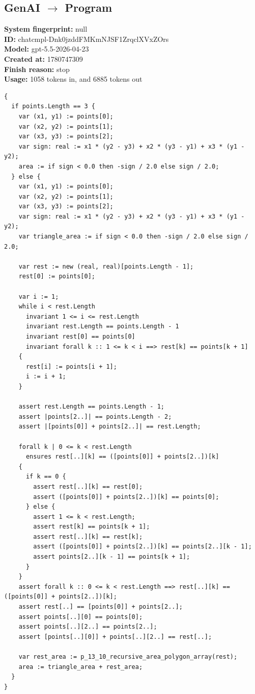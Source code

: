 \documentclass{article}
\begin{document}
\subsection*{GenAI $\rightarrow$ Program}
\textbf{System fingerprint: }null
\\\textbf{ID: }chatcmpl-Dnk0jzddFMKmNJSF1ZrqclXVxZOrs
\\\textbf{Model: }gpt-5.5-2026-04-23
\\\textbf{Created at: }1780747309
\\\textbf{Finish reason: }stop
\\\textbf{Usage: }1058 tokens in, and 6885 tokens out
\begin{lstlisting}
{
  if points.Length == 3 {
    var (x1, y1) := points[0];
    var (x2, y2) := points[1];
    var (x3, y3) := points[2];
    var sign: real := x1 * (y2 - y3) + x2 * (y3 - y1) + x3 * (y1 - y2);
    area := if sign < 0.0 then -sign / 2.0 else sign / 2.0;
  } else {
    var (x1, y1) := points[0];
    var (x2, y2) := points[1];
    var (x3, y3) := points[2];
    var sign: real := x1 * (y2 - y3) + x2 * (y3 - y1) + x3 * (y1 - y2);
    var triangle_area := if sign < 0.0 then -sign / 2.0 else sign / 2.0;

    var rest := new (real, real)[points.Length - 1];
    rest[0] := points[0];

    var i := 1;
    while i < rest.Length
      invariant 1 <= i <= rest.Length
      invariant rest.Length == points.Length - 1
      invariant rest[0] == points[0]
      invariant forall k :: 1 <= k < i ==> rest[k] == points[k + 1]
    {
      rest[i] := points[i + 1];
      i := i + 1;
    }

    assert rest.Length == points.Length - 1;
    assert |points[2..]| == points.Length - 2;
    assert |[points[0]] + points[2..]| == rest.Length;

    forall k | 0 <= k < rest.Length
      ensures rest[..][k] == ([points[0]] + points[2..])[k]
    {
      if k == 0 {
        assert rest[..][k] == rest[0];
        assert ([points[0]] + points[2..])[k] == points[0];
      } else {
        assert 1 <= k < rest.Length;
        assert rest[k] == points[k + 1];
        assert rest[..][k] == rest[k];
        assert ([points[0]] + points[2..])[k] == points[2..][k - 1];
        assert points[2..][k - 1] == points[k + 1];
      }
    }
    assert forall k :: 0 <= k < rest.Length ==> rest[..][k] == ([points[0]] + points[2..])[k];
    assert rest[..] == [points[0]] + points[2..];
    assert points[..][0] == points[0];
    assert points[..][2..] == points[2..];
    assert [points[..][0]] + points[..][2..] == rest[..];

    var rest_area := p_13_10_recursive_area_polygon_array(rest);
    area := triangle_area + rest_area;
  }
}
\end{lstlisting}
\end{document}

